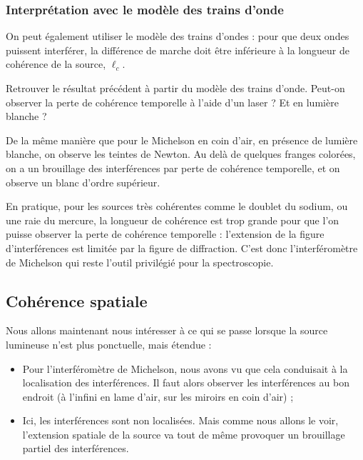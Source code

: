 \documentclass[11pt,fleqn]{book} %
\begin{document}
\subsubsection{Interprétation avec le modèle des trains d'onde}

On peut également utiliser le modèle des trains d'ondes : pour que deux ondes puissent interférer, la différence de marche doit être inférieure à la longueur de cohérence de la source, $\ell_c$.

\begin{capex}
	Retrouver le résultat précédent à partir du modèle des trains d'onde. Peut-on observer la perte de cohérence temporelle à l'aide d'un laser ? Et en lumière blanche ? 
\end{capex}

De la même manière que pour le Michelson en coin d'air, en présence de lumière blanche, on observe les teintes de Newton. Au delà de quelques franges colorées, on a un brouillage des interférences par perte de cohérence temporelle, et on observe un blanc d'ordre supérieur.

\begin{remark}
	En pratique, pour les sources très cohérentes comme le doublet du sodium, ou une raie du mercure, la longueur de cohérence est trop grande pour que l'on puisse observer la perte de cohérence temporelle : l'extension de la figure d'interférences est limitée par la figure de diffraction. C'est donc l'interféromètre de Michelson qui reste l'outil privilégié pour la spectroscopie.
\end{remark}

\subsection{Cohérence spatiale}

Nous allons maintenant nous intéresser à ce qui se passe lorsque la source lumineuse n'est plus ponctuelle, mais étendue :
\begin{itemize}
	\item Pour l'interféromètre de Michelson, nous avons vu que cela conduisait à la localisation des interférences. Il faut alors observer les interférences au bon endroit (à l'infini en lame d'air, sur les miroirs en coin d'air) ;
	\item Ici, les interférences sont non localisées. Mais comme nous allons le voir, l'extension spatiale de la source va tout de même provoquer un brouillage partiel des interférences.
\end{itemize}
\end{document}
